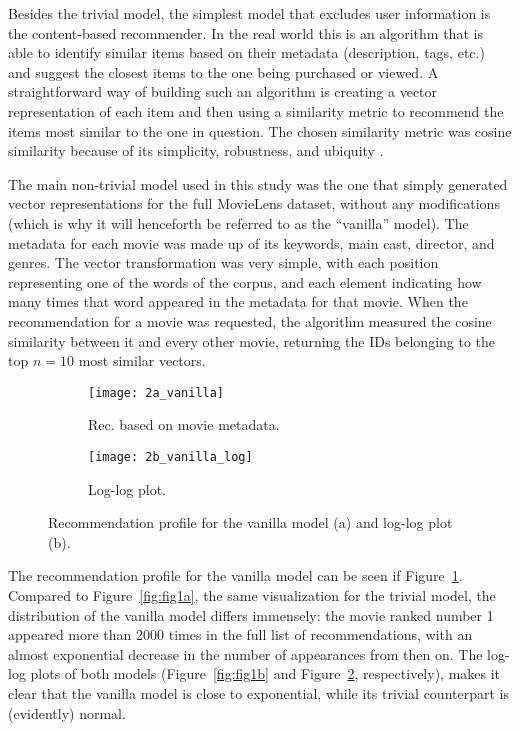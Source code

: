 Besides the trivial model, the simplest model that excludes user information is
the content-based recommender. In the real world this is an algorithm that is
able to identify similar items based on their metadata (description, tags, etc.)
and suggest the closest items to the one being purchased or viewed. A
straightforward way of building such an algorithm is creating a vector
representation of each item and then using a similarity metric to recommend the
items most similar to the one in question. The chosen similarity metric was
cosine similarity because of its simplicity, robustness, and ubiquity
\citep{sarwar_item-based_2001}.

The main non-trivial model used in this study was the one that simply generated
vector representations for the full MovieLens dataset, without any modifications
(which is why it will henceforth be referred to as the ``vanilla'' model). The
metadata for each movie was made up of its keywords, main cast, director, and
genres. The vector transformation was very simple, with each position
representing one of the words of the corpus, and each element indicating how
many times that word appeared in the metadata for that movie. When the
recommendation for a movie was requested, the algorithm measured the cosine
similarity between it and every other movie, returning the IDs belonging to
the top $n = 10$ most similar vectors.

\begin{figure}
  \centering
  \begin{subfigure}{0.45\textwidth}
    \centering
    \texttt{[image: 2a\_vanilla]}
    \caption{Rec. based on movie metadata.\label{fig:fig2a}}
  \end{subfigure}
  \begin{subfigure}{0.45\textwidth}
    \centering
    \texttt{[image: 2b\_vanilla\_log]}
    \caption{Log-log plot.\label{fig:fig2b}}
  \end{subfigure}
  \caption{Recommendation profile for the vanilla model (a) and log-log plot
    (b).\label{fig:fig2}}
\end{figure}

The recommendation profile for the vanilla model can be seen if
Figure~\ref{fig:fig2a}. Compared to Figure~\ref{fig:fig1a}, the same
visualization for the trivial model, the distribution of the vanilla model
differs immensely: the movie ranked number 1 appeared more than 2000 times in
the full list of recommendations, with an almost exponential decrease in the
number of appearances from then on. The log-log plots of both models
(Figure~\ref{fig:fig1b} and Figure~\ref{fig:fig2b}, respectively), makes it
clear that the vanilla model is close to exponential, while its trivial
counterpart is (evidently) normal.

